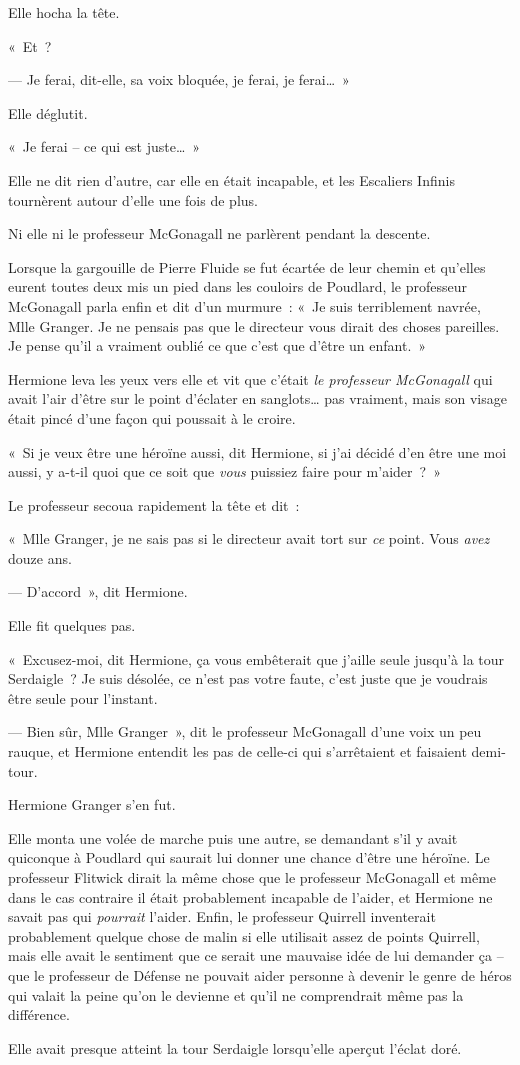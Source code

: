 Elle hocha la tête.

«~Et~?

--- Je ferai, dit-elle, sa voix bloquée, je ferai, je ferai…~»

Elle déglutit.

«~Je ferai -- ce qui est juste…~»

Elle ne dit rien d'autre, car elle en était incapable, et les Escaliers Infinis tournèrent autour d'elle une fois de plus.

Ni elle ni le professeur McGonagall ne parlèrent pendant la descente.

Lorsque la gargouille de Pierre Fluide se fut écartée de leur chemin et qu'elles eurent toutes deux mis un pied dans les couloirs de Poudlard, le professeur McGonagall parla enfin et dit d'un murmure~: «~Je suis terriblement navrée, Mlle Granger. Je ne pensais pas que le directeur vous dirait des choses pareilles. Je pense qu'il a vraiment oublié ce que c'est que d'être un enfant.~»

Hermione leva les yeux vers elle et vit que c'était \emph{le professeur McGonagall} qui avait l'air d'être sur le point d'éclater en sanglots… pas vraiment, mais son visage était pincé d'une façon qui poussait à le croire.

«~Si je veux être une héroïne aussi, dit Hermione, si j'ai décidé d'en être une moi aussi, y a-t-il quoi que ce soit que \emph{vous} puissiez faire pour m'aider~?~»

Le professeur secoua rapidement la tête et dit~:

«~Mlle Granger, je ne sais pas si le directeur avait tort sur \emph{ce} point. Vous \emph{avez} douze ans.

--- D'accord~», dit Hermione.

Elle fit quelques pas.

«~Excusez-moi, dit Hermione, ça vous embêterait que j'aille seule jusqu'à la tour Serdaigle~? Je suis désolée, ce n'est pas votre faute, c'est juste que je voudrais être seule pour l'instant.

--- Bien sûr, Mlle Granger~», dit le professeur McGonagall d'une voix un peu rauque, et Hermione entendit les pas de celle-ci qui s'arrêtaient et faisaient demi-tour.

Hermione Granger s'en fut.

Elle monta une volée de marche puis une autre, se demandant s'il y avait quiconque à Poudlard qui saurait lui donner une chance d'être une héroïne. Le professeur Flitwick dirait la même chose que le professeur McGonagall et même dans le cas contraire il était probablement incapable de l'aider, et Hermione ne savait pas qui \emph{pourrait} l'aider. Enfin, le professeur Quirrell inventerait probablement quelque chose de malin si elle utilisait assez de points Quirrell, mais elle avait le sentiment que ce serait une mauvaise idée de lui demander ça -- que le professeur de Défense ne pouvait aider personne à devenir le genre de héros qui valait la peine qu'on le devienne et qu'il ne comprendrait même pas la différence.

Elle avait presque atteint la tour Serdaigle lorsqu'elle aperçut l'éclat doré.
